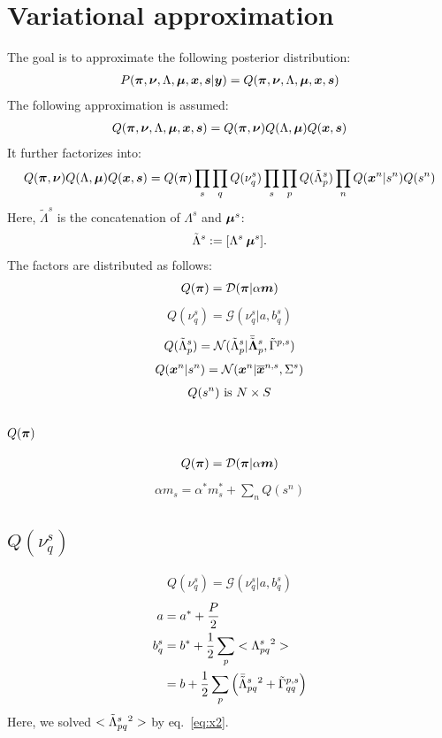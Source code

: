 \documentclass[a4paper]{article}
\begin{document}
\section{Variational approximation}
The goal is to approximate the following posterior distribution:
\begin{align}
  P(\boldsymbol{\pi},\boldsymbol{\nu},\Lambda,\boldsymbol{\mu},\boldsymbol{x},\boldsymbol{s}|\boldsymbol{y})=Q(\boldsymbol{\pi},\boldsymbol{\nu},\Lambda,\boldsymbol{\mu},\boldsymbol{x},\boldsymbol{s})
\end{align}
The following approximation is assumed:
\begin{align}
  Q(\boldsymbol{\pi},\boldsymbol{\nu},\Lambda,\boldsymbol{\mu},\boldsymbol{x},\boldsymbol{s})=Q(\boldsymbol{\pi},\boldsymbol{\nu})Q(\Lambda,\boldsymbol{\mu})Q(\boldsymbol{x},\boldsymbol{s})
\end{align}
It further factorizes into:
\begin{align}
  Q(\boldsymbol{\pi},\boldsymbol{\nu})Q(\Lambda,\boldsymbol{\mu})Q(\boldsymbol{x},\boldsymbol{s})=Q(\boldsymbol{\pi})\prod_s\prod_q Q(\nu_q^s)\prod_s\prod_p Q(\tilde{\Lambda}^s_p) \prod_n Q(\boldsymbol{x}^n|s^n)Q(s^n)
\end{align}
Here, $\tilde{\Lambda}^s$ is the concatenation of $\Lambda^s$ and $\boldsymbol{\mu}^s$:
\begin{align}
  \tilde{\Lambda}^s:=[\Lambda^s \: \boldsymbol{\mu}^s].
\end{align}
The factors are distributed as follows:
\begin{align}
  Q(\boldsymbol{\pi})=\mathcal{D}(\boldsymbol{\pi}|\alpha\boldsymbol{m})
\end{align}
\begin{align}
 Q(\nu^s_q)=\mathcal{G}(\nu^s_q|a, b_q^s)
\end{align}
\begin{align}
  Q(\tilde{\Lambda}^s_p)=\mathcal{N}(\tilde{\Lambda}^s_p|\bar{\tilde{\boldsymbol{\Lambda}}}^s_p,\tilde{\Gamma}^{p,s})
\end{align}
\begin{align}
  Q(\boldsymbol{x}^n|s^n)=\mathcal{N}(\boldsymbol{x}^n|\overline{\boldsymbol{x}}^{n,s},\Sigma^s)
\end{align}
\begin{align}
  Q(s^n)\text{ is }N\times S
\end{align}

\subsection{$Q(\boldsymbol{\pi})$}
\begin{align}
  Q(\boldsymbol{\pi})=\mathcal{D}(\boldsymbol{\pi}|\alpha\boldsymbol{m})
\end{align}
\begin{align}
  \alpha m_s=\alpha^*m^*_s+\sum_n Q(s^n)
\end{align}

\subsection{$Q(\nu_q^s)$}
\begin{align}
 Q(\nu^s_q)=\mathcal{G}(\nu^s_q|a, b_q^s)
\end{align}
\begin{align}
a&=a^*+\frac{P}{2} \\
b_q^s&=b^*+\frac{1}{2}\sum_p<\Lambda^s_{pq}{}^2> \\
&=b+\frac{1}{2}\sum_p\left(\bar{\tilde{\Lambda}}^s_{pq}{}^2 + \tilde{\Gamma}^{p,s}_{qq}\right)
\end{align}
Here, we solved $<\tilde{\Lambda}^s_{pq}{}^2>$ by eq.~\ref{eq:x2}.
\end{document}
